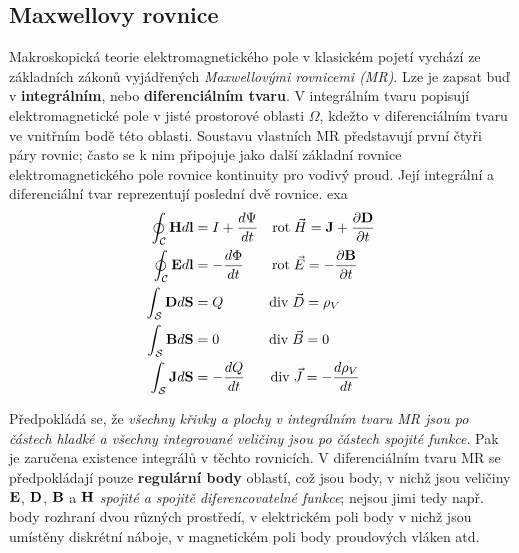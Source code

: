     \subsection{Maxwellovy rovnice}
      Makroskopická teorie elektromagnetického pole v klasickém pojetí vychází ze základních zákonů
      vyjádřených \emph{Maxwellovými rovnicemi (MR)}. Lze je zapsat buď v \textbf{integrálním},
      nebo \textbf{diferenciálním tvaru}. V integrálním tvaru popisují elektromagnetické pole v
      jisté prostorové oblasti $\Omega$, kdežto v diferenciálním tvaru ve vnitřním bodě této
      oblasti. Soustavu vlastních MR představují první čtyři páry rovnic; často se k nim připojuje
      jako další základní rovnice elektromagnetického pole rovnice kontinuity pro vodivý proud.
      Její integrální a diferenciální tvar reprezentují poslední dvě rovnice.
exa
      \begin{align}
        \oint_\mathcal{C}\mathbf{H} d\mathbf{l} &= I+\dfrac{d \Psi}{d t}
                                           \quad \mathrm{rot}\;\vec{H}=\mathbf{J}+\dfrac{\partial \mathbf{D}}{\partial t}             \\
        \oint_\mathcal{C}\mathbf{E} d\mathbf{l} &= -\dfrac{d \Phi}{d t}
                               \qquad \mathrm{rot}\;\vec{E}=-\dfrac{\partial \mathbf{B}}{\partial t}\\
         \int_\mathcal{S}\mathbf{D} d\mathbf{S} &= Q \qquad\quad\;   \mathrm{div}\;\vec{D}=\rho_V                \\
         \int_\mathcal{S}\mathbf{B} d\mathbf{S} &= 0 \qquad\quad\;\; \mathrm{div}\;\vec{B}=0                     \\
         \int_\mathcal{S}\mathbf{J} d\mathbf{S} &= -\dfrac{d Q}{d t} \quad\;\;\;\mathrm{div}\;\vec{J}=-\dfrac{d \rho_V}{d t}
      \end{align}

      Předpokládá se, že \emph{všechny křivky a plochy v integrálním tvaru MR jsou po částech
      hladké a všechny integrované veličiny jsou po částech spojité funkce}. Pak je zaručena
      existence integrálů v těchto rovnicích. V diferenciálním tvaru MR se předpokládají pouze
      \textbf{regulární body} oblastí, což jsou body, v nichž jsou veličiny $\mathbf{E}$, $\mathbf{D}$,
      $\mathbf{B}$ a $\mathbf{H}$ \emph{spojité a spojitě diferencovatelné funkce}; nejsou jimi tedy např.
      body rozhraní dvou různých prostředí, v elektrickém poli body v nichž jsou umístěny diskrétní
      náboje, v magnetickém poli body proudových vláken atd.

        
      
